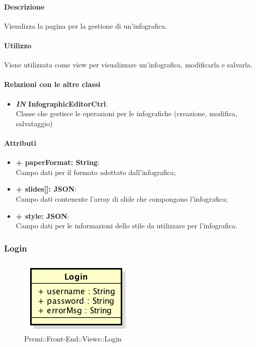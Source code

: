 	\paragraph{Descrizione}
	Visualizza la pagina per la gestione di un'infografica.
	
	\paragraph{Utilizzo}
	Viene utilizzata come view per visualizzare un'infografica, modificarla e salvarla.
	
	\paragraph{Relazioni con le altre classi}
	\begin{itemize}
		\item \textbf{\textit{IN} InfographicEditorCtrl}:\\
			Classe che gestisce le operazioni per le infografiche (creazione, modifica, salvataggio)
	\end{itemize}
	
	\paragraph{Attributi}
	\begin{itemize}
		\item \textbf{+ paperFormat: String}:\\
			Campo dati per il formato adottato dall'infografica;
		\item \textbf{+ slides[]: JSON}:\\
			Campo dati contenente l'array di slide che compongono l'infografica;
		\item \textbf{+ style: JSON}:\\
		Campo dati per le informazioni dello stile da utilizzare per l'infografica.
	\end{itemize}
	
	
\subsubsection{Login}
	\begin{figure}[h]
		\centering
		\includegraphics[width=0.3\linewidth]{img/premi_front_end_views_login}
		\caption[Premi::Front-End::Views::Login]{Premi::Front-End::Views::Login}
	\end{figure}
	
